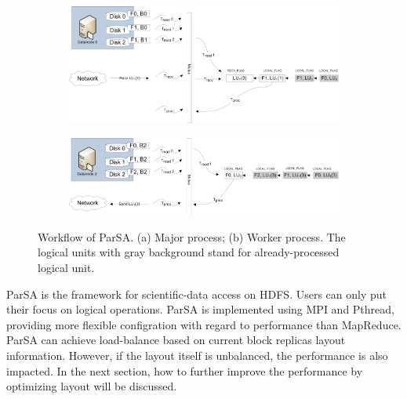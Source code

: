 \documentclass[preprint,12pt]{elsarticle}
\begin{document}
\begin{figure}[htb]
    \centering
    \begin{subfigure}{1\textwidth}
        \includegraphics[width=\textwidth]{figure6a}
        \caption{}
        \label{figure6a}
    \end{subfigure}

    \begin{subfigure}{\textwidth}
        \centering
        \includegraphics[width=1\textwidth]{figure6b}%
        \caption{}
        \label{figure6b}
    \end{subfigure}
    \caption{Workflow of ParSA. (a) Major process; (b) Worker process. The logical units with gray background stand for already-processed
             logical unit.}
    \label{figure6}
\end{figure}


ParSA is the framework for scientific-data access on HDFS. Users can only put their focus on logical operations. ParSA is implemented 
using MPI and Pthread, providing more flexible configration with regard to performance than MapReduce. ParSA can achieve load-balance based
on current block replicas layout information. However, if the layout itself is unbalanced, the performance is also impacted. In the next 
section, how to further improve the performance by optimizing layout will be discussed.
\end{document}

